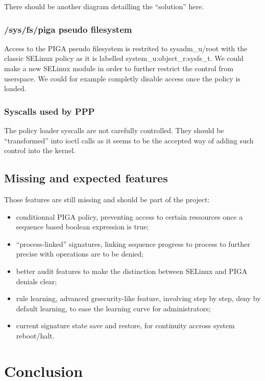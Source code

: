 \documentclass[pdftex,a4paper,titlepage,11pt]{article}
\begin{document}
\bigskip

There should be another diagram detailling the ``solution'' here.

\subsubsection{/sys/fs/piga pseudo filesystem}

Access to the PIGA pseudo filesystem is restrited to sysadm\_u/root with the
classic SELinux policy as it is labelled system\_u:object\_r:sysfs\_t. We could
make a new SELinux module in order to further restrict the control from
userspace. We could for example completly disable access once the policy is
loaded.

\subsubsection{Syscalls used by PPP}

The policy loader syscalls are not carefully controlled. They should be
``transformed'' into ioctl calls as it seems to be the accepted way of adding
such control into the kernel.

\subsection{Missing and expected features}

Those features are still missing and should be part of the project:

\begin{itemize}
	\item conditionnal PIGA policy, preventing access to certain ressources
once a sequence based boolean expression is true;
	\item ``process-linked'' signatures, linking sequence progress to process
to further precise with operations are to be denied;
	\item better audit features to make the distinction between SELinux and PIGA
denials clear;
	\item rule learning, advanced grsecurity-like feature, involving step by
step, deny by default learning, to ease the learning curve for administrators;
	\item current signature state save and restore, for continuity accross
system reboot/halt.
\end{itemize}

\newpage

\section*{Conclusion} 
\end{document}
